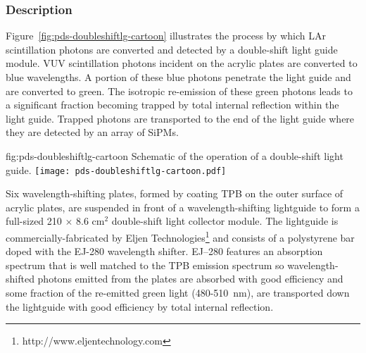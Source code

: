 \subsubsection{Description}

Figure~\ref{fig:pds-doubleshiftlg-cartoon} illustrates the process by which LAr scintillation photons are converted and detected by a double-shift light guide module. VUV scintillation photons incident on the acrylic plates are converted to blue wavelengths. A portion of these blue photons penetrate the light guide and are converted to green. The isotropic re-emission of these green photons leads to a significant fraction becoming trapped by total internal reflection within the light guide. Trapped photons are transported to the end of the light guide where they are detected by an array of SiPMs.

\begin{dunefigure}{fig:pds-doubleshiftlg-cartoon}
{Schematic of the operation of a double-shift light guide.}
  \texttt{[image: pds-doubleshiftlg-cartoon.pdf]}
\end{dunefigure}




Six wavelength-shifting plates, formed by coating TPB on the outer surface of acrylic plates, are suspended in front of a wavelength-shifting lightguide to form a full-sized 210 $\times$ 8.6 cm$^2$ double-shift light collector module. The lightguide is commercially-fabricated by Eljen Technologies\footnote{http://www.eljentechnology.com} and consists of a polystyrene bar doped with the EJ-280 wavelength shifter. EJ--280
 features an absorption spectrum that is well matched to the TPB emission spectrum so wavelength-shifted photons emitted from the plates are absorbed with good efficiency and some fraction of the re-emitted green light (480-510~nm), are transported down the lightguide with good efficiency by total internal reflection. 

